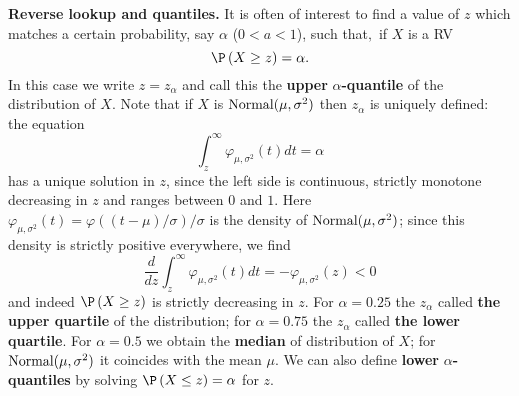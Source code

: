 \textbf{Reverse lookup and quantiles.} It is often of interest to find a
value of $z$ which matches a certain probability, say $\alpha $ ($0<a<1$),
such that$,$ if $X$ is a RV 
\begin{equation*}
\P \left( X\geq z\right) =\alpha .
\end{equation*}%
In this case we write $z=z_{\alpha}$ and call this the \textbf{%
upper }$\alpha $\textbf{-quantile} of the distribution of $X$. Note that if $%
X$ is $\mbox{{\rm Normal}}(\mu ,\sigma ^{2})$ then $z_{\alpha}$ is uniquely defined:
the equation 
\begin{equation*}
\int_{z}^{\infty }\varphi _{\mu ,\sigma ^{2}}(t)dt=\alpha
\end{equation*}%
has a unique solution in $z$, since the left side is continuous, strictly
monotone decreasing in $z$ and ranges between $0$ and $1$. Here $\varphi
_{\mu ,\sigma ^{2}}(t)=\varphi (\left( t-\mu \right) /\sigma )/\sigma $ is
the density of $\mbox{{\rm Normal}}(\mu ,\sigma ^{2})$; since this density is strictly
positive everywhere, we find 
\begin{equation*}
\frac{d}{dz}\int_{z}^{\infty }\varphi _{\mu ,\sigma ^{2}}(t)dt=-\varphi
_{\mu ,\sigma ^{2}}(z)<0
\end{equation*}%
and indeed $\P \left( X\geq z\right) $ is strictly decreasing in $z$. For $%
\alpha =0.25$ the $z_{\alpha}$ called \textbf{the upper quartile}
of the distribution; for $\alpha =0.75$ the $z_{\alpha}$ called 
\textbf{the lower quartile}. For $\alpha =0.5$ we obtain the \textbf{median}
of distribution of $X$; for $\mbox{{\rm Normal}}(\mu ,\sigma ^{2})$ it coincides with the mean 
$\mu $. We can also define \textbf{lower }$\alpha $\textbf{-quantiles} by
solving $\P \left( X\leq z\right) =\alpha $ for $z$.



